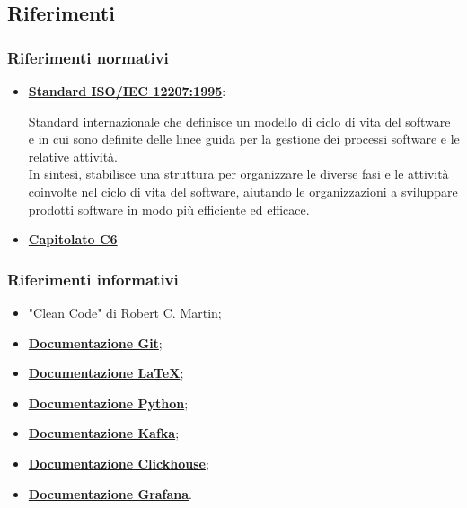 \subsection{Riferimenti}
\subsubsection{Riferimenti normativi}
\begin{itemize}
    \item \href{https://www.math.unipd.it/~tullio/IS-1/2009/Approfondimenti/ISO_12207-1995.pdf}{\textbf{Standard ISO/IEC 12207:1995}}:
        
    Standard internazionale che definisce un modello di ciclo di vita del software e in cui sono definite delle linee guida per la gestione dei processi software e le relative attività.\\
    In sintesi, stabilisce una struttura per organizzare le diverse fasi e le attività coinvolte nel ciclo di vita del software, aiutando le organizzazioni a sviluppare prodotti software in modo più efficiente ed efficace.

    \item \href{https://www.math.unipd.it/~tullio/IS-1/2023/Progetto/C6.pdf}{\textbf{Capitolato C6}}

\end{itemize}
\subsubsection{Riferimenti informativi}
\begin{itemize}
    \item "Clean Code" di Robert C. Martin;
    \item \href{https://git-scm.com/docs}{\textbf{Documentazione Git}};
    \item \href{https://www.latex-project.org/help/documentation/}{\textbf{Documentazione \LaTeX}};
    \item \href{https://docs.python.org/3/}{\textbf{Documentazione Python}};
    \item \href{https://kafka.apache.org/documentation/}{\textbf{Documentazione Kafka}};
    \item \href{https://clickhouse.com/docs}{\textbf{Documentazione Clickhouse}};
    \item \href{https://grafana.com/docs/grafana/latest/}{\textbf{Documentazione Grafana}}.
\end{itemize}
